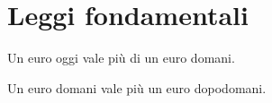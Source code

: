 
\chapter{Leggi fondamentali}
\label{chap:Leggi_fondamentali}

\begin{legge}
  Un euro oggi vale più di un euro domani.
\end{legge}

\begin{legge}
  Un euro domani vale più un euro dopodomani.
\end{legge}